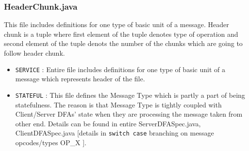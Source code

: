 \documentclass[12pt]{usenixsubmit}
\begin{document}
    \subsubsection{HeaderChunk.java}This file includes definitions for one type of basic unit of a message. Header chunk is a tuple where first element of the tuple denotes type of operation and second element of the tuple denots the number of the chunks which are going to follow header chunk.
    \begin{itemize}
    \item {\tt SERVICE} : Entire file includes definitions for one type of basic unit of a message which represents header of the file.
      \item {\tt STATEFUL} : This file defines the Message Type  which is partly a part of being statefulness. The reason is that Message Type is tightly coupled with Client/Server DFAs' state when they are processing the message taken from other end. Details can be found in entire ServerDFASpec.java, ClientDFASpec.java [details in {\tt switch case} branching on message opcodes/types OP\_X ].
     \end{itemize}   
\end{document}
